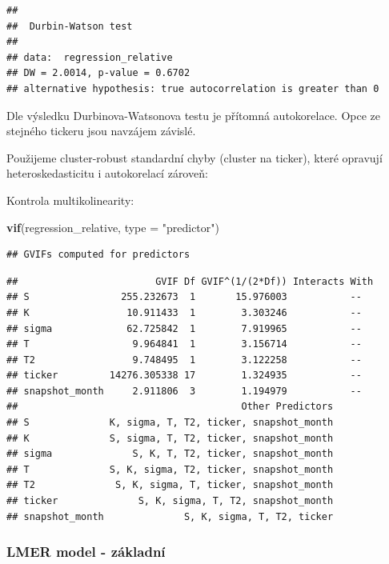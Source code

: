 \documentclass[
]{article}
\newenvironment{Shaded}{\begin{snugshade}}{\end{snugshade}}
\newcommand{\AttributeTok}[1]{\textcolor[rgb]{0.13,0.29,0.53}{#1}}
\newcommand{\FunctionTok}[1]{\textcolor[rgb]{0.13,0.29,0.53}{\textbf{#1}}}
\newcommand{\NormalTok}[1]{#1}
\newcommand{\StringTok}[1]{\textcolor[rgb]{0.31,0.60,0.02}{#1}}
\begin{document}
\begin{verbatim}
## 
##  Durbin-Watson test
## 
## data:  regression_relative
## DW = 2.0014, p-value = 0.6702
## alternative hypothesis: true autocorrelation is greater than 0
\end{verbatim}

Dle výsledku Durbinova-Watsonova testu je přítomná autokorelace. Opce ze
stejného tickeru jsou navzájem závislé.

Použijeme cluster-robust standardní chyby (cluster na ticker), které
opravují heteroskedasticitu i autokorelací zároveň:

Kontrola multikolinearity:

\begin{Shaded}
\begin{Highlighting}[]
\FunctionTok{vif}\NormalTok{(regression\_relative, }\AttributeTok{type =} \StringTok{"predictor"}\NormalTok{)}
\end{Highlighting}
\end{Shaded}

\begin{verbatim}
## GVIFs computed for predictors
\end{verbatim}

\begin{verbatim}
##                        GVIF Df GVIF^(1/(2*Df)) Interacts With
## S                255.232673  1       15.976003           --  
## K                 10.911433  1        3.303246           --  
## sigma             62.725842  1        7.919965           --  
## T                  9.964841  1        3.156714           --  
## T2                 9.748495  1        3.122258           --  
## ticker         14276.305338 17        1.324935           --  
## snapshot_month     2.911806  3        1.194979           --  
##                                       Other Predictors
## S              K, sigma, T, T2, ticker, snapshot_month
## K              S, sigma, T, T2, ticker, snapshot_month
## sigma              S, K, T, T2, ticker, snapshot_month
## T              S, K, sigma, T2, ticker, snapshot_month
## T2              S, K, sigma, T, ticker, snapshot_month
## ticker              S, K, sigma, T, T2, snapshot_month
## snapshot_month              S, K, sigma, T, T2, ticker
\end{verbatim}

\subsubsection{LMER model -
základní}\label{lmer-model---zuxe1kladnuxed-1}
\end{document}
